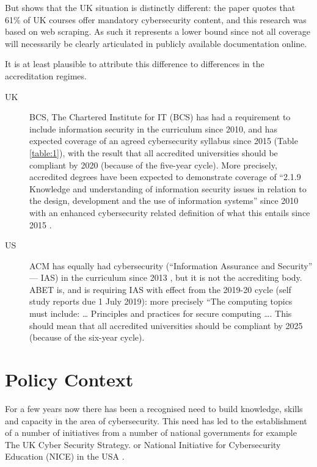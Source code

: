 \documentclass[conference]{IEEEtran}
\begin{document}
But \cite[Table 1]{Ruiz2019a} shows that the UK situation is distinctly different: the paper quotes that 61\% of UK courses offer mandatory cybersecurity content, and this research was based on web scraping. As such it represents a lower bound since not all coverage will necessarily be clearly articulated in publicly available documentation online.

It is at least plausible to attribute this difference to differences in the accreditation regimes.
\begin{description}
\item[UK]BCS, The Chartered Institute for IT (BCS) has had a requirement to include information security in the curriculum since 2010, and has expected coverage of an agreed cybersecurity syllabus since 2015 (Table \ref{table:1}), with the result that all accredited universities should be compliant by 2020 (because of the five-year cycle). More precisely, accredited degrees have been expected to demonstrate coverage of ``2.1.9 Knowledge and understanding of information security issues in relation to the design, development and the use of information  systems'' \cite[p.~30]{BCS2018a} since 2010 with an enhanced cybersecurity related definition of what this entails since 2015 \cite[p.~17--18]{BCS2018a}.
\item[US]ACM has equally had cybersecurity (``Information Assurance and Security'' --- IAS) in the curriculum since 2013 \cite{ACM2013a}, but it is not the accrediting body. ABET is, and is requiring IAS with effect from the 2019-20 cycle (self study reports due 1 July 2019): more precisely \cite[Table 3]{Oudshoornetal2018a} ``The computing topics must include: \dots{} Principles and practices for secure computing \dots. This should mean that  all accredited universities should be compliant by 2025 (because of the six-year cycle).
\end{description}

\section{Policy Context}

For a few years now there has been a recognised need to build knowledge, skills and capacity in the area of cybersecurity. This need has led to the establishment of a number of initiatives from a number of national governments for example The UK Cyber Security Strategy. \cite{UKCabinetOffice} or National Initiative for Cybersecurity Education (NICE) in the USA \cite{NICE}. 
\end{document}
